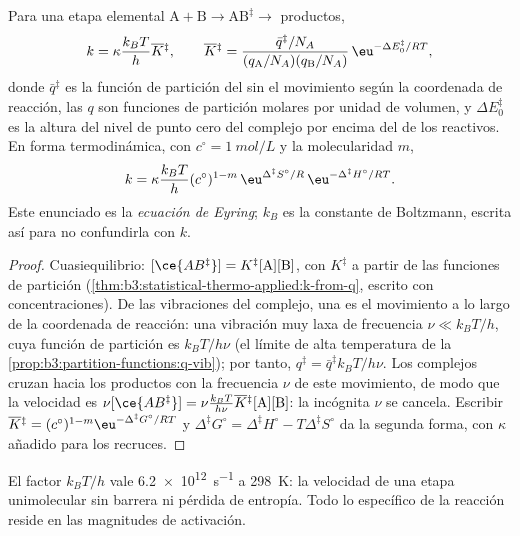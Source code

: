 \begin{theorem}\label{thm:b3:rate-theories:eyring}
Para una etapa elemental $\mathrm{A + B} \to \mathrm{AB}^{\ddagger} \to$ productos,
\[
  k = \kappa\frac{k_BT}{h}\overline{K}{}^{\ddagger}, \qquad
  \overline{K}{}^{\ddagger} = \frac{\bar q^{\ddagger}/N_A}{(q_{\mathrm A}/N_A)(q_{\mathrm B}/N_A)}\,\eu^{-\Delta E_0^{\ddagger}/RT},
\]
donde $\bar q^{\ddagger}$ es la función de partición del  sin el
movimiento según la coordenada de reacción, las $q$ son funciones de partición molares por unidad
de volumen, y $\Delta E_0^{\ddagger}$ es la altura del nivel de punto cero del complejo por encima del
de los reactivos. En forma termodinámica, con $c^\circ = \qty{1}{mol/L}$ y la
molecularidad $m$,
\[
  k = \kappa\frac{k_BT}{h}(c^\circ)^{1-m}\,\eu^{\Delta^{\ddagger}S^\circ/R}\,\eu^{-\Delta^{\ddagger}H^\circ/RT}.
\]
Este enunciado es la \emph{ecuación de Eyring}; $k_B$ es la
constante de Boltzmann, escrita así para no confundirla con $k$.
\end{theorem}

\begin{proof}
Cuasiequilibrio: $[\ce{AB^{\ddagger}}] = K^{\ddagger}[\mathrm A][\mathrm B]$, con $K^{\ddagger}$ a partir de las funciones de partición
(\cref{thm:b3:statistical-thermo-applied:k-from-q}, escrito con concentraciones).
De las vibraciones del complejo, una es el movimiento a lo largo de la coordenada
de reacción: una vibración muy laxa de frecuencia $\nu \ll k_BT/h$, cuya función de
partición es $k_BT/h\nu$ (el límite de alta temperatura de la
\cref{prop:b3:partition-functions:q-vib}); por tanto, $q^{\ddagger} = \bar q^{\ddagger}k_BT/h\nu$. Los
complejos cruzan hacia los productos con la frecuencia $\nu$ de este movimiento, de modo que la
velocidad es $\nu[\ce{AB^{\ddagger}}] = \nu\frac{k_BT}{h\nu}\overline{K}{}^{\ddagger}[\mathrm A][\mathrm B]$: la incógnita $\nu$ se cancela. Escribir
$\overline{K}{}^{\ddagger} = (c^\circ)^{1-m}\eu^{-\Delta^{\ddagger}G^\circ/RT}$ y $\Delta^{\ddagger}G^\circ = \Delta^{\ddagger}H^\circ - T\Delta^{\ddagger}S^\circ$ da la
segunda forma, con $\kappa$ añadido para los recruces.
\end{proof}

El factor $k_BT/h$ vale \qty{6.2e12}{s^{-1}} a \qty{298}{K}: la velocidad de una etapa unimolecular
sin barrera ni pérdida de entropía. Todo lo específico de la reacción reside
en las magnitudes de activación.

